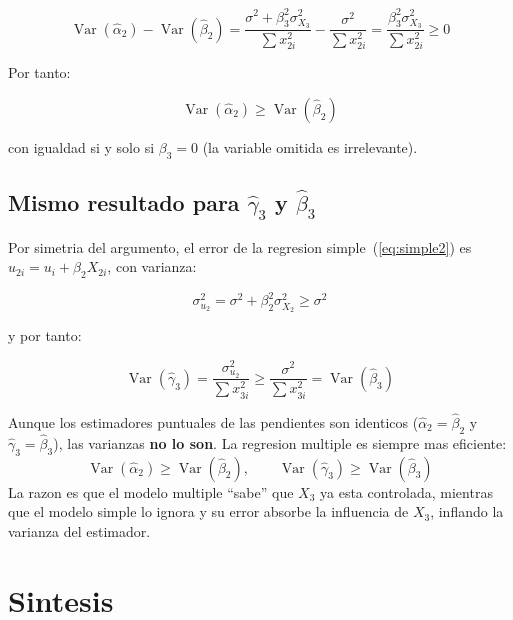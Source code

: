 \documentclass[12pt, letterpaper]{article}
\theoremstyle{remark}
\newcommand{\Var}{\operatorname{Var}}
\begin{document}
\begin{equation}
  \Var(\hat\alpha_2) - \Var(\hat\beta_2)
    = \frac{\sigma^2 + \beta_3^2 \sigma_{X_3}^2}{\sum x_{2i}^2}
    - \frac{\sigma^2}{\sum x_{2i}^2}
    = \frac{\beta_3^2 \sigma_{X_3}^2}{\sum x_{2i}^2}
    \geq 0
  \label{eq:diferencia_var}
\end{equation}

Por tanto:

\begin{equation}
  \boxed{
    \Var(\hat\alpha_2) \geq \Var(\hat\beta_2)
  }
  \label{eq:ineq_var}
\end{equation}

con igualdad si y solo si $\beta_3 = 0$ (la variable omitida es irrelevante).

\subsection{Mismo resultado para \texorpdfstring{$\hat\gamma_3$}{gamma3} y \texorpdfstring{$\hat\beta_3$}{beta3}}

Por simetria del argumento, el error de la regresion simple~(\ref{eq:simple2})
es $u_{2i} = u_i + \beta_2 X_{2i}$, con varianza:

\begin{equation}
  \sigma_{u_2}^2 = \sigma^2 + \beta_2^2 \sigma_{X_2}^2 \geq \sigma^2
  \label{eq:var_error_simple2}
\end{equation}

y por tanto:

\begin{equation}
  \Var(\hat\gamma_3) = \frac{\sigma_{u_2}^2}{\sum x_{3i}^2} \geq \frac{\sigma^2}{\sum x_{3i}^2} = \Var(\hat\beta_3)
  \label{eq:ineq_var_gamma}
\end{equation}

\begin{clave}
  Aunque los estimadores puntuales de las pendientes son identicos
  ($\hat\alpha_2 = \hat\beta_2$ y $\hat\gamma_3 = \hat\beta_3$), las
  varianzas \textbf{no lo son}. La regresion multiple es siempre mas
  eficiente:
  \[
    \Var(\hat\alpha_2) \geq \Var(\hat\beta_2), \qquad
    \Var(\hat\gamma_3) \geq \Var(\hat\beta_3)
  \]
  La razon es que el modelo multiple ``sabe'' que $X_3$ ya esta controlada,
  mientras que el modelo simple lo ignora y su error absorbe la influencia
  de $X_3$, inflando la varianza del estimador.
\end{clave}

\section{Sintesis}
\end{document}

